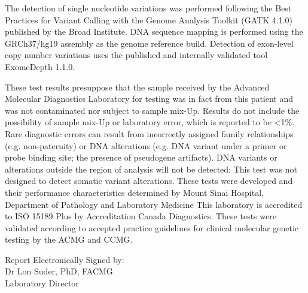 \documentclass[10pt]{extarticle}
\begin{document}
The detection of single nucleotide variations was performed following the Best Practices for Variant Calling with the Genome Analysis Toolkit (GATK 4.1.0) published by the Broad Institute. DNA sequence mapping is performed using the GRCh37/hg19 assembly as the genome reference build. Detection of exon-level copy number variations uses the published and internally validated tool ExomeDepth 1.1.0.

These test results presuppose that the sample received by the Advanced Molecular Diagnostics Laboratory for testing was in fact from this patient and was not contaminated nor subject to sample mix-Up. Results do not include the possibility of sample mix-Up or laboratory error, which is reported to be <1\%. Rare diagnostic errors can result from incorrectly assigned family relationships (e.g. non-paternity) or DNA alterations (e.g. DNA variant under a primer or probe binding site; the presence of pseudogene artifacts). DNA variants or alterations outside the region of analysis will not be detected: This test was not designed to detect somatic variant alterations. These tests were developed and their performance characteristics determined by Mount Sinai Hospital, Department of Pathology and Laboratory Medicine This laboratory is accredited to ISO 15189 Plus by Accreditation Canada Diagnostics. These tests were validated according to accepted practice guidelines for clinical molecular genetic testing by the ACMG and CCMG.

\vspace{2em}
\hfill \parbox{10cm}{
Report Electronically Signed by: \\
Dr Lon Suder, PhD, FACMG \\
Laboratory Director
}
\end{document}
